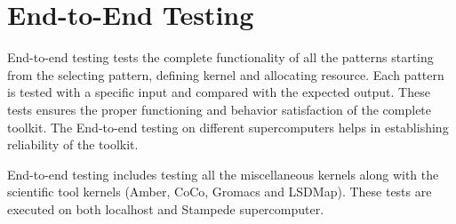 \documentclass[10pt]{ruthesis}
\begin{document}
\section{End-to-End Testing}
End-to-end testing tests the complete functionality of all the patterns starting from the selecting pattern, defining kernel and allocating resource. Each pattern is tested with a specific input and compared with the expected output. These tests ensures the proper functioning and behavior satisfaction of the complete toolkit. The End-to-end testing on different supercomputers helps in establishing reliability of the toolkit. 

End-to-end testing includes testing all the miscellaneous kernels along with the scientific tool kernels (Amber, CoCo, Gromacs and LSDMap). These tests are executed on both localhost and Stampede supercomputer.
\end{document}
